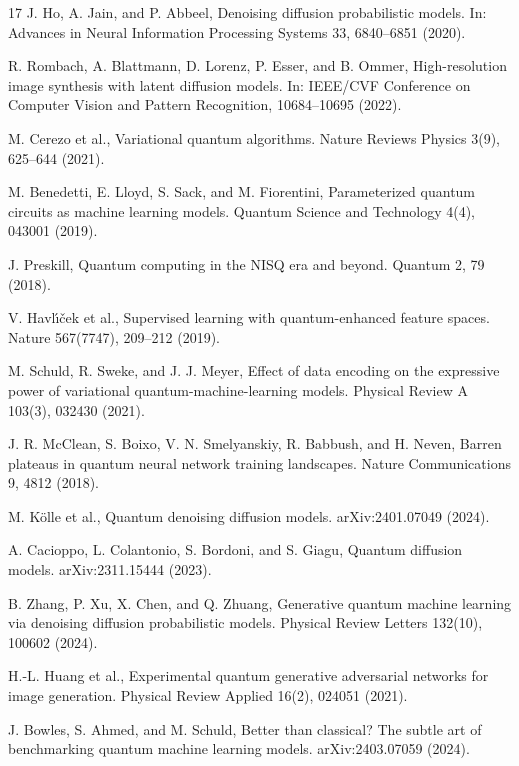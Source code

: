 \documentclass[runningheads]{llncs}
\begin{document}
\begin{thebibliography}{17}
J. Ho, A. Jain, and P. Abbeel,
Denoising diffusion probabilistic models.
In: Advances in Neural Information Processing Systems 33, 6840--6851 (2020).

R. Rombach, A. Blattmann, D. Lorenz, P. Esser, and B. Ommer,
High-resolution image synthesis with latent diffusion models.
In: IEEE/CVF Conference on Computer Vision and Pattern Recognition, 10684--10695 (2022).

M. Cerezo et al.,
Variational quantum algorithms.
Nature Reviews Physics 3(9), 625--644 (2021).

M. Benedetti, E. Lloyd, S. Sack, and M. Fiorentini,
Parameterized quantum circuits as machine learning models.
Quantum Science and Technology 4(4), 043001 (2019).

J. Preskill,
Quantum computing in the NISQ era and beyond.
Quantum 2, 79 (2018).

V. Havl\'{\i}\v{c}ek et al.,
Supervised learning with quantum-enhanced feature spaces.
Nature 567(7747), 209--212 (2019).

M. Schuld, R. Sweke, and J. J. Meyer,
Effect of data encoding on the expressive power of variational quantum-machine-learning models.
Physical Review A 103(3), 032430 (2021).

J. R. McClean, S. Boixo, V. N. Smelyanskiy, R. Babbush, and H. Neven,
Barren plateaus in quantum neural network training landscapes.
Nature Communications 9, 4812 (2018).

M. K\"olle et al.,
Quantum denoising diffusion models.
arXiv:2401.07049 (2024).

A. Cacioppo, L. Colantonio, S. Bordoni, and S. Giagu,
Quantum diffusion models.
arXiv:2311.15444 (2023).

B. Zhang, P. Xu, X. Chen, and Q. Zhuang,
Generative quantum machine learning via denoising diffusion probabilistic models.
Physical Review Letters 132(10), 100602 (2024).

H.-L. Huang et al.,
Experimental quantum generative adversarial networks for image generation.
Physical Review Applied 16(2), 024051 (2021).

J. Bowles, S. Ahmed, and M. Schuld,
Better than classical? The subtle art of benchmarking quantum machine learning models.
arXiv:2403.07059 (2024).


\end{thebibliography}
\end{document}
